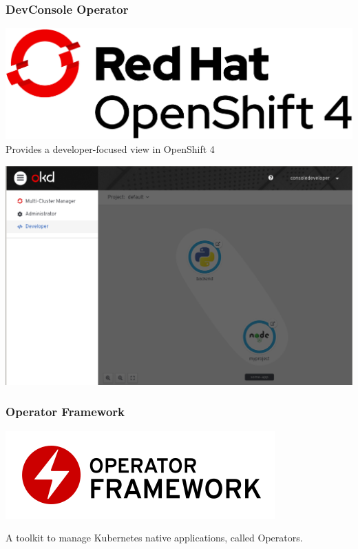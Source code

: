 \documentclass[aspectratio=169]{beamer}
\begin{document}
\begin{frame}
  \frametitle{DevConsole Operator}

  \includegraphics[scale=.15]{images/Logo-Red_Hat-OpenShift_4-A-Standard-RGB.png}\\[.25in]

  Provides a developer-focused view in OpenShift 4

\end{frame}

\begin{frame}

  \includegraphics[scale=.25]{images/devconsole.png}

\end{frame}

\begin{frame}
  \frametitle{Operator Framework}

  \includegraphics[scale=.50]{images/operator_logo_framework_color.png}

  A toolkit to manage Kubernetes native applications, called Operators.

\end{frame}
\end{document}
